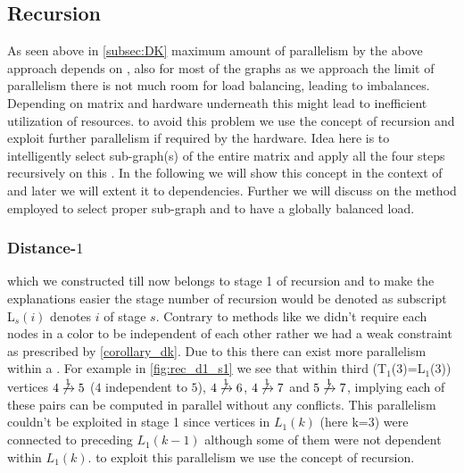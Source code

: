	\subsection{Recursion}\label{subsec:REC}
	As seen above in \cref{subsec:DK} maximum amount of parallelism by the above approach depends on \totalLvl, also for most of the graphs as we approach the limit of parallelism there is not much room for load balancing, leading to imbalances. Depending on matrix and hardware underneath this might lead to inefficient utilization of resources. \Inorder to avoid this problem we use the concept of recursion and exploit further parallelism if required by the hardware. Idea here is to intelligently select sub-graph(s) of the entire matrix and apply all the four steps recursively on this \subgraph. In the following we will show this concept in the context of \DONE and  later we will extent it to \DK dependencies. Further we will discuss on the method employed to select proper sub-graph and to have a globally balanced load.
	
	\subsubsection{Distance-$1$}
	\LevelGroups which we constructed till now belongs to stage 1 of recursion and to make the explanations easier the stage number of recursion would be denoted as subscript \ie L$_s(i)$ denotes \level $i$ of stage $s$. Contrary to methods like \MCfull we didn't require each nodes in a color to be \DONE independent of each other rather we had a weak constraint as prescribed by \cref{corollary_dk}. Due to this there can exist more parallelism within a \levelGroup. For example in \cref{fig:rec_d1_s1} we see that within third \levelGroup (T$_1$(3)=L$_1$(3)) vertices $4 \not\xrightarrow{1} 5$ ($4$  \DONE independent to $5$), $4 \not\xrightarrow{1} 6$, $4 \not\xrightarrow{1} 7$ and $5 \not\xrightarrow{1} 7$, implying each of these pairs can be computed in parallel without any \DONE conflicts. This parallelism couldn't be exploited in stage 1 since vertices in $L_1(k)$ (here k=3) were connected to preceding \level $L_1(k-1)$ although some of them were not \DONE dependent within $L_1(k)$. \Inorder to exploit this parallelism we use the concept of recursion.
	
